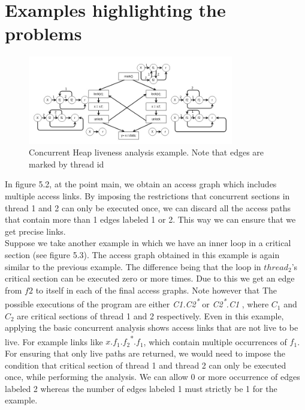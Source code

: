\section{Examples highlighting the problems}

\begin{figure}
	\centering
	\includegraphics[width=0.8\textwidth]{Figures/conc_analysis_thr_itr3.jpg}
	\caption{Concurrent Heap liveness analysis example. Note that edges are marked by thread id}
	\label{fig:threadidanalysis}
\end{figure}

In figure 5.2, at the point main, we obtain an access graph which includes multiple access links. By imposing the restrictions that concurrent sections in thread 1 and 2 can only be executed once, we can discard all the access paths that contain more than 1 edges labeled 1 or 2. This way we can ensure that we get precise links. \\

Suppose we take another example in which we have an inner loop in a critical section (see figure 5.3). The access  graph obtained in this example is again similar to the previous example. The difference being that the loop in $thread_2$'s critical section can be executed zero or more times. Due to this we get an edge from $f2$ to itself in each of the final access graphs. Note however that  The possible executions of the program are either \emph{C1.C2\textsuperscript{*} } or \emph{ C2\textsuperscript{*}.C1 } , where $C_1$ and $C_2$ are critical sections of thread 1 and 2 respectively. Even in this example, applying the basic concurrent analysis shows access links that are not live to be live. For example links like {$x$.$f_1$.$f_2$\textsuperscript{*}.$f_1$}, which contain multiple occurrences of $f_1$. \\

For ensuring that only live paths are returned, we would need to impose the condition that critical section of thread 1 and thread 2 can only be executed once, while performing the analysis. We can allow 0 or more occurrence of edges labeled 2 whereas the number of edges labeled 1 must strictly be 1 for the example. \\ 

